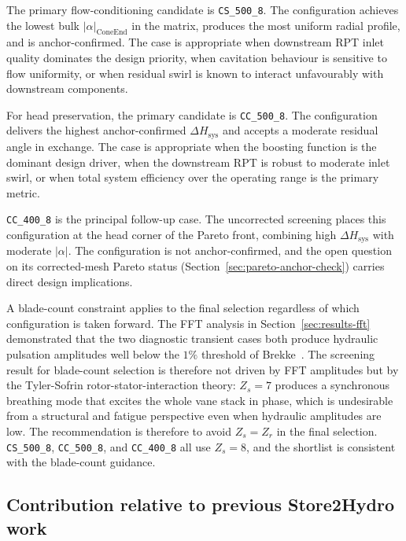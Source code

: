 The primary flow-conditioning candidate is \texttt{CS\_500\_8}. The configuration achieves the lowest bulk $|\alpha|_{\mathrm{ConeEnd}}$ in the matrix, produces the most uniform radial profile, and is anchor-confirmed. The case is appropriate when downstream RPT inlet quality dominates the design priority, when cavitation behaviour is sensitive to flow uniformity, or when residual swirl is known to interact unfavourably with downstream components.

For head preservation, the primary candidate is \texttt{CC\_500\_8}. The configuration delivers the highest anchor-confirmed $\Delta H_{\mathrm{sys}}$ and accepts a moderate residual angle in exchange. The case is appropriate when the boosting function is the dominant design driver, when the downstream RPT is robust to moderate inlet swirl, or when total system efficiency over the operating range is the primary metric.

\texttt{CC\_400\_8} is the principal follow-up case. The uncorrected screening places this configuration at the head corner of the Pareto front, combining high $\Delta H_{\mathrm{sys}}$ with moderate $|\alpha|$. The configuration is not anchor-confirmed, and the open question on its corrected-mesh Pareto status (Section~\ref{sec:pareto-anchor-check}) carries direct design implications.

A blade-count constraint applies to the final selection regardless of which configuration is taken forward. The FFT analysis in Section~\ref{sec:results-fft} demonstrated that the two diagnostic transient cases both produce hydraulic pulsation amplitudes well below the $1\%$ threshold of Brekke~\cite{Brekke2010,Brekke2001}. The screening result for blade-count selection is therefore not driven by FFT amplitudes but by the Tyler-Sofrin rotor-stator-interaction theory: $Z_s = 7$ produces a synchronous breathing mode that excites the whole vane stack in phase, which is undesirable from a structural and fatigue perspective even when hydraulic amplitudes are low. The recommendation is therefore to avoid $Z_s = Z_r$ in the final selection. \texttt{CS\_500\_8}, \texttt{CC\_500\_8}, and \texttt{CC\_400\_8} all use $Z_s = 8$, and the shortlist is consistent with the blade-count guidance.

\subsection{Contribution relative to previous Store2Hydro work}
\label{sec:contribution}

